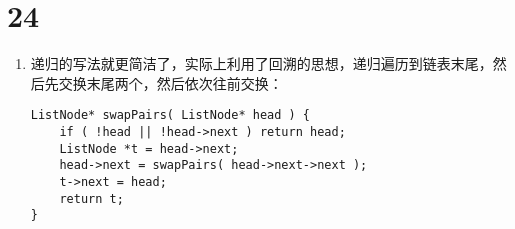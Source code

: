 \documentclass[12pt,a4paper]{article}
\begin{document}
\section{24}
\begin{enumerate}
\begin{CJK}{UTF8}{gbsn}
这道题不算难，是基本的链表操作题，我们可以分别用递归和迭代来实现。对于迭代实现，还是需要建立dummy节点，注意在连接节点的时候，最好画个图，以免把自己搞晕了
\end{CJK}
\begin{lstlisting}
ListNode* swapPairs( ListNode* head ) {
	ListNode *dummy = new ListNode( -1 ), *pre = dummy;
	dummy->next = head;
	while ( pre->next && pre->next->next ) {
		ListNode *t = pre->next->next;
		pre->next->next = t->next;
		t->next = pre->next;
		pre->next = t;
		pre = t->next;
	}
	return dummy->next;
}
\end{lstlisting}
\item
\begin{CJK}{UTF8}{gbsn}
递归的写法就更简洁了，实际上利用了回溯的思想，递归遍历到链表末尾，然后先交换末尾两个，然后依次往前交换：
\end{CJK}
\begin{lstlisting}
ListNode* swapPairs( ListNode* head ) {
	if ( !head || !head->next ) return head;
	ListNode *t = head->next;
	head->next = swapPairs( head->next->next );
	t->next = head;
	return t;
}
\end{lstlisting}
\end{enumerate}
\end{document}
